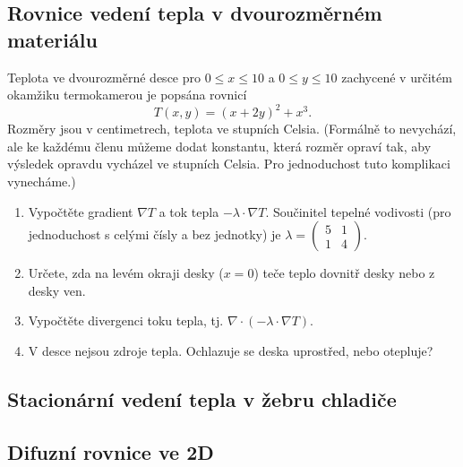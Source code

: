 \konec


\subsection{Rovnice vedení tepla v dvourozměrném materiálu}


Teplota ve dvourozměrné desce pro $0\leq x\leq 10$ a $0\leq y\leq 10$ zachycené v určitém okamžiku termokamerou je popsána rovnicí
  $$T(x,y)=(x+2y)^2+x^3.$$
  Rozměry jsou v centimetrech, teplota ve stupních Celsia. (Formálně to nevychází, ale ke každému členu můžeme dodat konstantu, která rozměr opraví tak, aby výsledek opravdu vycházel ve stupních Celsia. Pro jednoduchost tuto komplikaci vynecháme.)

\begin{enumerate}
\item Vypočtěte gradient $\nabla T$  a tok tepla $-\lambda \cdot \nabla T.$
Součinitel tepelné vodivosti (pro jednoduchost s celými čísly a bez jednotky) je $\lambda=
  \begin{pmatrix}
    5 & 1\\1&4
  \end{pmatrix}.
$ 
\item Určete, zda na levém okraji desky ($x=0$) teče teplo dovnitř desky nebo z desky ven.
\item Vypočtěte divergenci toku tepla, tj. $\nabla\cdot(-\lambda \cdot \nabla T).$
\item V desce nejsou zdroje tepla. Ochlazuje se deska uprostřed, nebo otepluje?
\end{enumerate}


\stranka
\subsection{Stacionární vedení tepla v žebru chladiče}

\subsection{Difuzní rovnice ve 2D}

